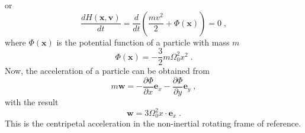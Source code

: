 \documentclass[preprint, aps, pra]{revtex4-1}
\newcommand{\bx}{{\bm{x}}}
\newcommand{\bv}{{\bm{v}}}
\newcommand{\be}{{\bm{e}}}
\newcommand{\bw}{{\bm{w}}}
\newcommand{\pd}{\partial}
\begin{document}
or 
\begin{equation}
  \frac{dH(\bx,\bv)}{dt}=\frac{d}{dt}\left(\frac{mv^2}{2}+\Phi(\bx)\right)=0\;,
\end{equation}
where $\Phi(\bx)$ is the potential function of a particle with mass $m$
\begin{equation}
  \Phi(\bx) = -\frac{3}{2}m\Omega_0^2x^2\;.
\end{equation}
Now, the acceleration of a particle can be obtained from
\begin{equation}
  m\bw = -\frac{\pd\Phi}{\pd x}\be_x-\frac{\pd\Phi}{\pd y}\be_y\;,
\end{equation}
with the result
\begin{equation}
  \bw = 3\Omega_0^2 x\cdot\be_x\;.
\end{equation}
This is the centripetal acceleration in the non-inertial rotating frame of reference.
\end{document}
